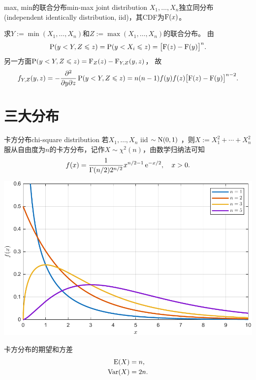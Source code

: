 \begin{example}{max, min的联合分布}{min-max joint distribution}
	$X_1,\ldots,X_n$独立同分布(independent identically distribution, iid)，其CDF为$\operatorname{F}(x)$。

	求$Y:=\min(X_1,\ldots,X_n)$和$Z:=\max(X_1,\ldots,X_n)$的联合分布。
	由
	\[
		\operatorname{P}(y<Y,Z\leqslant z)=\operatorname{P}(y<X_i\leqslant z)=\bigl[\operatorname{F}(z)-\operatorname{F}(y)\bigr]^n.
	\]
	另一方面$\operatorname{P}(y<Y,Z\leqslant z)=\operatorname{F}_Z(z)-\operatorname{F}_{Y,Z}(y,z)$，
	故
	\begin{equation}
		\label{eq:min-max joint distribution}
		f_{Y,Z}(y,z)=-\frac{\partial^2}{\partial y \partial z}\operatorname{P}(y<Y,Z\leqslant z)=n(n-1)f(y)f(z)\bigl[\operatorname{F}(z)-\operatorname{F}(y)\bigr]^{n-2}.
	\end{equation}
\end{example}

\section{三大分布}
\label{subsec:chi2, t, F}

\begin{definition}{卡方分布}{chi-square distribution}
	若$X_1,\ldots,X_n$ iid $\sim\operatorname{N}(0,1)$ ，则$X:=X_1^2+\cdots+X_n^2$服从自由度为$n$的卡方分布，记作$X\sim\chi^2(n)$，由数学归纳法可知
	\begin{equation}
		f(x)=\frac1{\Gamma(n/2)2^{n/2}}x^{n/2-1}\mathop{}\!\mathrm{e}^{-x/2},\quad x>0.
	\end{equation}
	\begin{center}
		\includegraphics[width=0.8\linewidth]{figures/pdf_chi2.pdf}
		\label{fig:pdf_chi2}
	\end{center}
\end{definition}

\begin{corollary}
	卡方分布的期望和方差
	\begin{subequations}
		\begin{align}
			\operatorname{E}(X) &= n,\\
			\operatorname{Var}(X) &= 2n.
		\end{align}
	\end{subequations}
\end{corollary}


